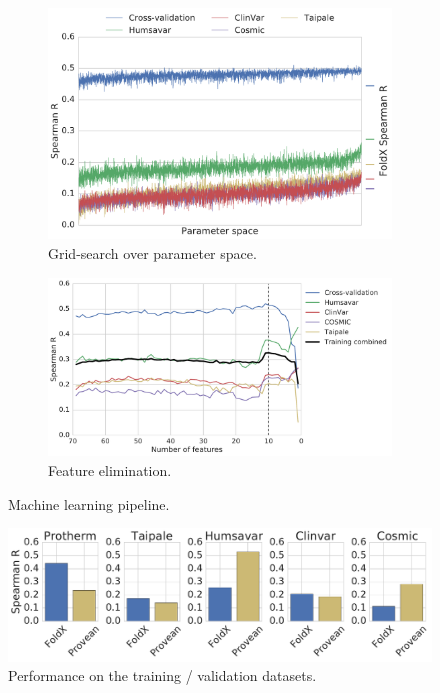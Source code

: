 
\begin{figure}[h]
	\begin{subfigure}[b]{0.6\textwidth}
		\includegraphics[width=1\linewidth]{static/elaspic_training_set/core_machine_learning/gridsearch.pdf}
		\caption{Grid-search over parameter space.}
		\label{fig:Ng1}
	\end{subfigure}

	\begin{subfigure}[b]{0.75\textwidth}
		\includegraphics[width=1\linewidth]{static/elaspic_training_set/core_machine_learning/feature_elimination.pdf}
		\caption{Feature elimination.}
		\label{fig:Ng1}
	\end{subfigure}

	\caption{Machine learning pipeline.}
\end{figure}


\clearpage

\begin{figure}[h]
	\centering
	\includegraphics[width=1.0\linewidth]{static/elaspic_training_set/core_data_statistics/initial_performance.pdf}
	\caption{Performance on the training / validation datasets.}
\end{figure}

